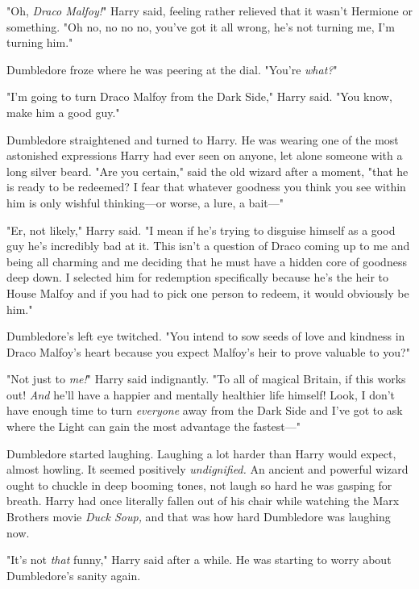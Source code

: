 "Oh, \emph{Draco Malfoy!}" Harry said, feeling rather relieved that it wasn't
Hermione or something. "Oh no, no no no, you've got it all wrong, he's not
turning me, I'm turning him."

Dumbledore froze where he was peering at the dial. "You're \emph{what?}"

"I'm going to turn Draco Malfoy from the Dark Side," Harry said. "You know,
make him a good guy."

Dumbledore straightened and turned to Harry. He was wearing one of the most
astonished expressions Harry had ever seen on anyone, let alone someone with a
long silver beard. "Are you certain," said the old wizard after a moment, "that
he is ready to be redeemed? I fear that whatever goodness you think you see
within him is only wishful thinking---or worse, a lure, a bait---"

"Er, not likely," Harry said. "I mean if he's trying to disguise himself as a
good guy he's incredibly bad at it. This isn't a question of Draco coming up to
me and being all charming and me deciding that he must have a hidden core of
goodness deep down. I selected him for redemption specifically because he's the
heir to House Malfoy and if you had to pick one person to redeem, it would
obviously be him."

Dumbledore's left eye twitched. "You intend to sow seeds of love and kindness
in Draco Malfoy's heart because you expect Malfoy's heir to prove valuable to
you?"

"Not just to \emph{me!}" Harry said indignantly. "To all of magical Britain, if
this works out! \emph{And} he'll have a happier and mentally healthier life
himself! Look, I don't have enough time to turn \emph{everyone} away from the
Dark Side and I've got to ask where the Light can gain the most advantage the
fastest---"

Dumbledore started laughing. Laughing a lot harder than Harry would expect,
almost howling. It seemed positively \emph{undignified.} An ancient and
powerful wizard ought to chuckle in deep booming tones, not laugh so hard he
was gasping for breath. Harry had once literally fallen out of his chair while
watching the Marx Brothers movie \emph{Duck Soup,} and that was how hard
Dumbledore was laughing now.

"It's not \emph{that} funny," Harry said after a while. He was starting to
worry about Dumbledore's sanity again.

